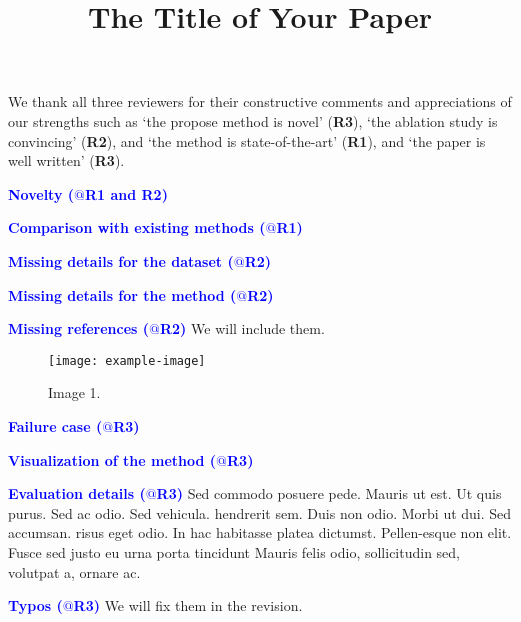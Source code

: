 \documentclass[10pt,twocolumn,letterpaper]{article}
\newcommand{\issue}[1]{\vspace{0.1em}\noindent \textcolor{blue}{\textbf{#1 \hspace{0.2em}}}}
\begin{document}
\title{The Title of Your Paper}

\maketitle

\thispagestyle{empty}
\appendix

We thank all three reviewers for their constructive comments and appreciations of our strengths such as `the propose method is novel' (\textbf{R3}), `the ablation study is convincing' (\textbf{R2}), and `the method is state-of-the-art' (\textbf{R1}), and `the paper is well written' (\textbf{R3}).


\begin{table}[t]
\centering
\caption{Table 1.}
\label{tab:table}
    \vspace{-1em}
\end{table}

\issue{Novelty ($@$R1 and R2)} 
\lipsum[1]

\issue{Comparison with existing methods ($@$R1)} 
\lipsum[2]

\issue{Missing details for the dataset ($@$R2)} 
\lipsum[3]

\issue{Missing details for the method ($@$R2)} 
\lipsum[4]

\issue{Missing references ($@$R2)} 
We will include them. 

\begin{figure}[tb] \centering
    \texttt{[image: example-image]}
    \caption{Image 1.} \label{fig:img1}
    \vspace{-1em}
\end{figure}

\issue{Failure case ($@$R3)} 
\lipsum[5]

\issue{Visualization of the method ($@$R3)} 
\lipsum[6]

\issue{Evaluation details ($@$R3)}
Sed commodo posuere pede. Mauris ut est. Ut quis purus. Sed ac odio. Sed vehicula. hendrerit sem. Duis non odio. Morbi ut dui. Sed accumsan. risus eget odio. In hac habitasse platea dictumst. Pellen-esque non elit. Fusce sed justo eu urna porta tincidunt Mauris felis odio, sollicitudin sed, volutpat a, ornare ac.

\issue{Typos ($@$R3)} 
We will fix them in the revision.
\end{document}
